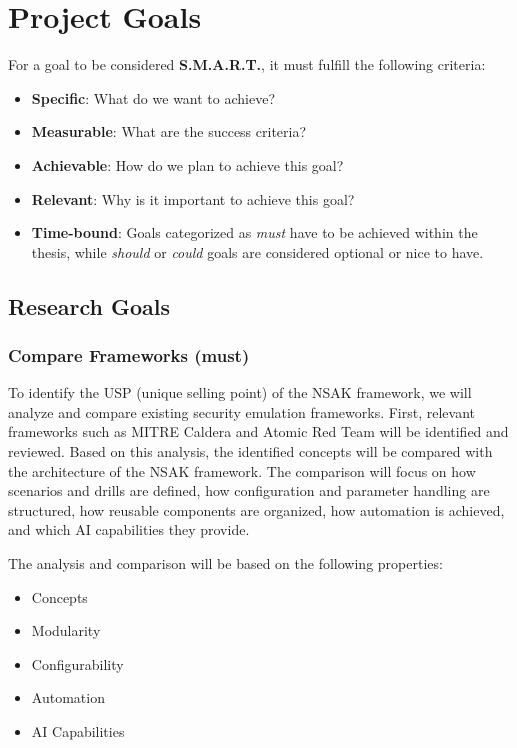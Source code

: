 
\newpage
\section{Project Goals}\label{sec:project-goals}

For a goal to be considered \textbf{S.M.A.R.T.}, it must fulfill the following criteria:

\begin{itemize}
	\item \textbf{Specific}: What do we want to achieve?
	\item \textbf{Measurable}: What are the success criteria?
	\item \textbf{Achievable}: How do we plan to achieve this goal?
	\item \textbf{Relevant}: Why is it important to achieve this goal?
	\item \textbf{Time-bound}: Goals categorized as \textit{must} have to be achieved within the thesis, while \textit{should} or \textit{could} goals are considered optional or nice to have.
\end{itemize}

\subsection{Research Goals}\label{subsec:research-goals}

\subsubsection{Compare Frameworks (must)}\label{subsubsec:compare-frameworks}

To identify the USP (unique selling point) of the \gls{NSAK} framework, we will analyze and compare existing security emulation frameworks.
First, relevant frameworks such as MITRE Caldera and Atomic Red Team will be identified and reviewed.
Based on this analysis, the identified concepts will be compared with the architecture of the \gls{NSAK} framework.
The comparison will focus on how scenarios and drills are defined, how configuration and parameter handling are structured, how reusable components are organized, how automation is achieved, and which \gls{AI} capabilities they provide.

The analysis and comparison will be based on the following properties:

\begin{itemize}
	\item Concepts
	\item Modularity
	\item Configurability
	\item Automation
	\item \gls{AI} Capabilities
\end{itemize}

